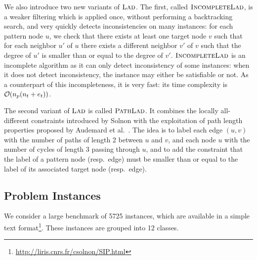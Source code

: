 \documentclass{llncs}
\newcommand{\LAD}{$\textsc{Lad}$\xspace}
\newcommand{\IncompleteLAD}{$\textsc{IncompleteLad}$\xspace}
\newcommand{\PathLAD}{$\textsc{PathLad}$\xspace}
\begin{document}
We also introduce two new variants of \LAD. The first, called \IncompleteLAD, is a weaker
filtering which is applied once, without performing a backtracking search, and very quickly
detects inconsistencies on many instances: for each pattern node $u$, we check that there exists at
least one target node $v$ such that for each neighbor $u'$ of $u$ there exists a different neighbor
$v'$ of $v$ such that the degree of $u'$ is smaller than or equal to the degree of $v'$.
\IncompleteLAD is an incomplete algorithm as it can only detect inconsistency of some instances: when
it does not detect inconsistency, the instance may either be satisfiable or not. As a counterpart of
this incompleteness, it is very fast: its time complexity is ${\cal O}(n_p(n_t+e_t))$.

The second variant of \LAD is called \PathLAD. It combines the locally all-different constraints
introduced by Solnon \cite{Solnon:2010} with the exploitation of path length properties proposed by
Audemard et al.\ \cite{Audemard:2014}. The idea is to label each edge $(u,v)$ with the number of
paths of length 2 between $u$ and $v$, and each node $u$ with the number of cycles of length 3
passing through $u$, and to add the constraint that the label of a pattern node (resp.\ edge) must
be smaller than or equal to the label of its associated target node (resp.\ edge).


\subsection{Problem Instances}

We consider a large benchmark of 5725 instances, which are available in a simple text
format\footnote{\url{http://liris.cnrs.fr/csolnon/SIP.html}}. These instances are grouped into 12
classes.
\end{document}

